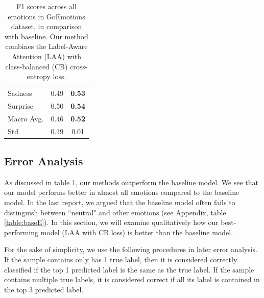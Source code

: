 \begin{table}[h]
\begin{center}
\begin{tabular}{|l |c| c|}
        Sadness & 0.49 & \textbf{0.53} \\
        Surprise & 0.50 & \textbf{0.54} \\
        \hline
        Macro Avg. & 0.46 &\textbf{0.52}\\
        \hline
        Std & 0.19 & 0.01 \\ %
        \hline
    \end{tabular}
    \end{center}
    \caption{F1 scores across all emotions in GoEmotions dataset, in comparison with baseline. Our method combines the Label-Aware Attention (LAA) with class-balanced (CB) cross-entropy loss.} %
    \label{tab:res}
\end{table}


\subsection{Error Analysis}

As discussed in table \ref{tab:res}, our methods outperform the baseline model. We see that our model performs better in almost all emotions compared to the baseline model. In the last report, we argued that the baseline model often fails to distinguish between ``neutral" and other emotions (see Appendix, table \ref{table:baseE}). In this section, we will examine qualitatively how our best-performing model (LAA with CB loss) is better than the baseline model. 

For the sake of simplicity, we use the following procedures in later error analysis. If the sample contains only has 1 true label, then it is considered correctly classified if the top 1 predicted label is the same as the true label. If the sample contains multiple true labels, it is considered correct if all its label is contained in the top 3 predicted label. 

